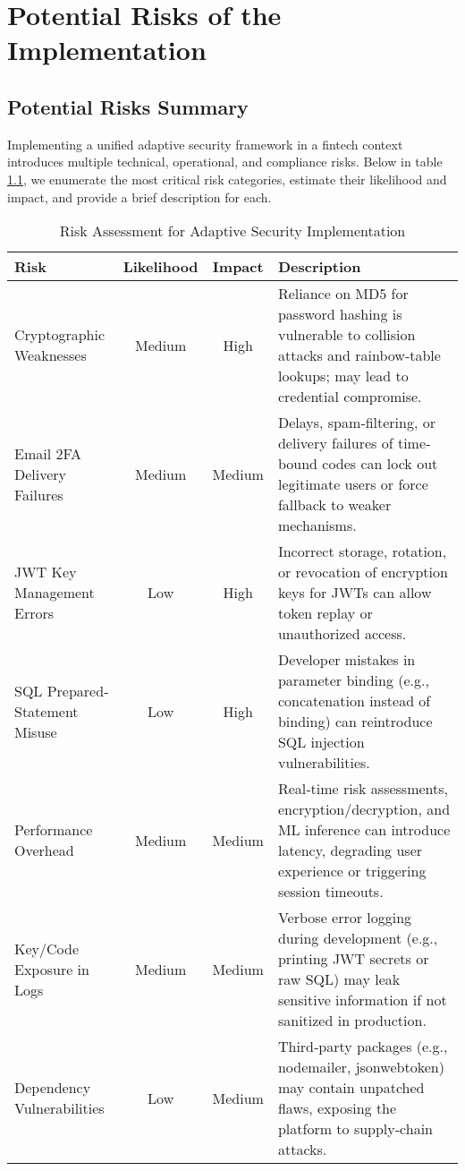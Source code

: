 \chapter{Potential Risks of the Implementation}

\section{Potential Risks Summary}
Implementing a unified adaptive security framework in a fintech context introduces multiple technical, operational, and compliance risks. Below in table \ref{tab:implementation-risks}, we enumerate the most critical risk categories, estimate their likelihood and impact, and provide a brief description for each.

\begin{table}[htbp]
  \centering
  \begin{tabular}{p{3cm} c c p{7cm}}
    \hline
    \textbf{Risk} & \textbf{Likelihood} & \textbf{Impact} & \textbf{Description} \\
    \hline
    Cryptographic Weaknesses & Medium & High &
      Reliance on MD5 for password hashing is vulnerable to collision attacks and rainbow‐table lookups; may lead to credential compromise. \\
    Email 2FA Delivery Failures & Medium & Medium &
      Delays, spam‐filtering, or delivery failures of time‐bound codes can lock out legitimate users or force fallback to weaker mechanisms. \\
    JWT Key Management Errors & Low & High &
      Incorrect storage, rotation, or revocation of encryption keys for JWTs can allow token replay or unauthorized access. \\
    SQL Prepared‐Statement Misuse & Low & High &
      Developer mistakes in parameter binding (e.g., concatenation instead of binding) can reintroduce SQL injection vulnerabilities. \\
    Performance Overhead & Medium & Medium &
      Real‐time risk assessments, encryption/decryption, and ML inference can introduce latency, degrading user experience or triggering session timeouts. \\
    Key/Code Exposure in Logs & Medium & Medium &
      Verbose error logging during development (e.g., printing JWT secrets or raw SQL) may leak sensitive information if not sanitized in production. \\
    Dependency Vulnerabilities & Low & Medium &
      Third‑party packages (e.g., nodemailer, jsonwebtoken) may contain unpatched flaws, exposing the platform to supply‑chain attacks. \\
    \hline
  \end{tabular}
  \caption{Risk Assessment for Adaptive Security Implementation}
  \label{tab:implementation-risks}
\end{table}

